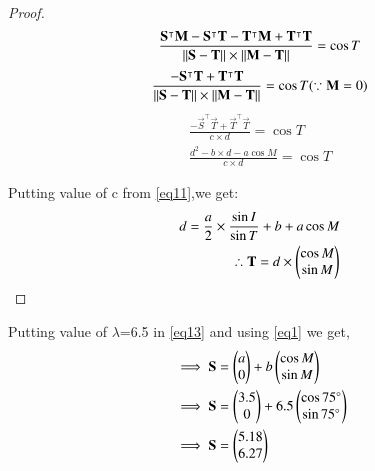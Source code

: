 \documentclass[journal,12pt,twocolumn]{IEEEtran}
\begin{document}
\begin{enumerate}
\begin{proof}
\begin{align}
\frac{\mathbf{S}^\intercal\mathbf{M}-\mathbf{S}^\intercal \mathbf{T}-\mathbf{T}^\intercal\mathbf{M}+\mathbf{T}^\intercal \mathbf{T}}{\Vert\mathbf{S-T}\rVert\times\Vert\mathbf{M-T}\rVert}=\cos T
\end{align}
\begin{align}
\frac{-\mathbf{S}^\intercal \mathbf{T}+\mathbf{T}^\intercal \mathbf{T}}{\Vert\mathbf{S-T}\rVert\times\Vert\mathbf{M-T}\rVert} = \cos T ( \because \mathbf{M}=0) \label{eqa}
\end{align}
\begin{align}
\frac{-\vec{S}^\intercal \vec{T}+\vec{T}^\intercal \vec{T}}{c\times d} =\cos T
\\ 
\frac{d^2-b\times d-a\cos M}{c\times d} =\cos T
\end{align}
\item Putting value of c from \eqref{eq11},we get:
\begin{align}
d=\frac{a}{2}\times\frac{\sin I}{\sin T}+ b+a \cos M    \label{eqa}
\\
\therefore \mathbf{T}=d \times{\ensuremath{\begin{pmatrix}\cos M\\ \sin M\end{pmatrix}}}
\end{align}
\end{proof}
\item Putting value of $\lambda$=6.5 in \eqref{eq13} and using \eqref{eq1} we get,
\begin{align}
&\implies \mathbf{S}=\begin{pmatrix}a\\0\end{pmatrix} +b\begin{pmatrix}\cos M \\\sin M\end{pmatrix}
\\
&\implies \mathbf{S}=\begin{pmatrix}3.5\\0\end{pmatrix} +6.5\begin{pmatrix}\cos 75 \degree\\\sin 75 \degree\end{pmatrix} 
\\
&\implies \mathbf{S}=\begin{pmatrix}5.18\\6.27\end{pmatrix}
\end{align}


\end{enumerate}
\end{document}
